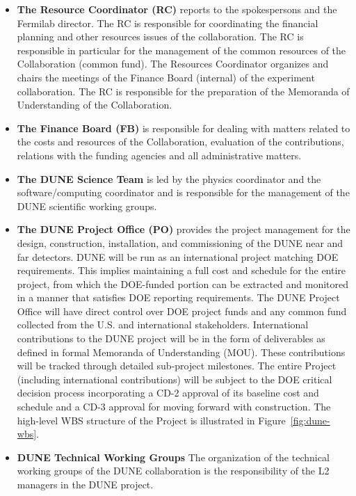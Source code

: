 \begin{itemize}
       \item \textbf{The Resource Coordinator (RC)} reports to the spokespersons and the Fermilab director. The RC
    is responsible for coordinating the financial planning and other
resources issues of the collaboration. The RC is responsible in particular for
the management of the common resources of the Collaboration (common fund).
The Resources Coordinator organizes and chairs the meetings of the Finance Board (internal) of
the experiment collaboration. The RC is responsible for the
preparation of the Memoranda of Understanding of the Collaboration.
    \item \textbf{The Finance Board (FB)} is responsible for dealing with matters related to
the costs and resources of the Collaboration, evaluation of the contributions, relations with the
funding agencies and all administrative matters.  
    \item \textbf{The DUNE Science Team} is led by the physics coordinator and the software/computing coordinator and is responsible for the management of the DUNE scientific working groups.
    \item \textbf{The DUNE Project Office (PO)} provides the project management for the design, construction, installation, and commissioning of the DUNE near and far detectors. DUNE will be run as an international project matching DOE requirements. This implies maintaining a full cost and schedule for the entire project, from which the DOE-funded portion can be extracted and monitored in a manner that satisfies DOE reporting requirements. The DUNE Project Office will have direct control over DOE project funds and any common fund collected from the U.S. and international stakeholders. International contributions to the DUNE project will be in the form of deliverables as defined in formal Memoranda of Understanding (MOU). These contributions will be tracked through detailed sub-project milestones. The entire Project (including international contributions) will be subject to the DOE critical decision process incorporating a CD-2 approval of its baseline cost and schedule and a CD-3 approval for moving forward with construction.  The high-level WBS structure of the Project is illustrated in Figure~\ref{fig:dune-wbs}.
    \item \textbf{DUNE Technical Working Groups} The organization of the technical working groups of the DUNE collaboration is the responsibility of the L2 managers in the DUNE project.
\end{itemize}


